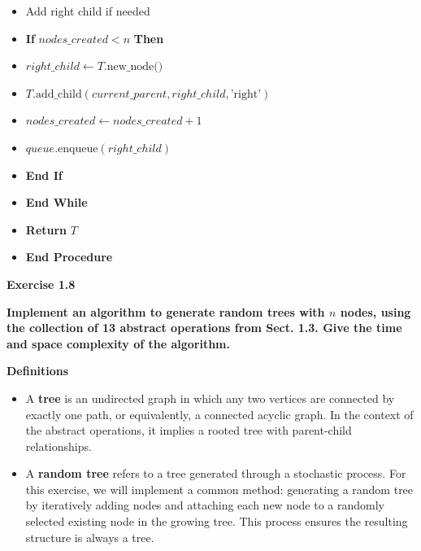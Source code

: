 \documentclass{article}
\begin{document}
\begin{itemize}
    \item \hspace{1cm} Add right child if needed
    \item \hspace{1cm} \textbf{If} $nodes\_created < n$ \textbf{Then}
    \item \hspace{1.5cm} $right\_child \gets T.\text{new\_node()}$
    \item \hspace{1.5cm} $T.\text{add\_child}(current\_parent, right\_child, \text{'right'})$
    \item \hspace{1.5cm} $nodes\_created \gets nodes\_created + 1$
    \item \hspace{1.5cm} $queue.\text{enqueue}(right\_child)$
    \item \hspace{1cm} \textbf{End If}
    \item \hspace{0.5cm} \textbf{End While}
    
    \item \hspace{0.5cm} \textbf{Return} $T$
    \item \textbf{End Procedure}
\end{itemize}

\textbf{Exercise 1.8}

\textbf{Implement an algorithm to generate random trees with $n$ nodes, using the collection of 13 abstract operations from Sect. 1.3. Give the time and space complexity of the algorithm.}

\textbf{Definitions}

\begin{itemize}
    \item A \textbf{tree} is an undirected graph in which any two vertices are connected by exactly one path, or equivalently, a connected acyclic graph. In the context of the abstract operations, it implies a rooted tree with parent-child relationships.
    \item A \textbf{random tree} refers to a tree generated through a stochastic process. For this exercise, we will implement a common method: generating a random tree by iteratively adding nodes and attaching each new node to a randomly selected existing node in the growing tree. This process ensures the resulting structure is always a tree.
\end{itemize}
\end{document}
